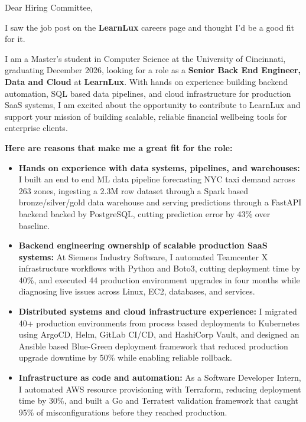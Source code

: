 \documentclass[11pt]{letter}
\date{}
\begin{document}
\begin{letter}{}

\opening{Dear Hiring Committee,}

I saw the job post on the \textbf{LearnLux} careers page and thought I'd be a good fit for it.

I am a Master's student in Computer Science at the University of Cincinnati, graduating December 2026, looking for a role as a \textbf{Senior Back End Engineer, Data and Cloud} at \textbf{LearnLux}. With hands on experience building backend automation, SQL based data pipelines, and cloud infrastructure for production SaaS systems, I am excited about the opportunity to contribute to LearnLux and support your mission of building scalable, reliable financial wellbeing tools for enterprise clients.

\textbf{Here are reasons that make me a great fit for the role:}

\begin{itemize}[leftmargin=*, itemsep=0.45em]
    \item \textbf{Hands on experience with data systems, pipelines, and warehouses:} I built an end to end ML data pipeline forecasting NYC taxi demand across 263 zones, ingesting a 2.3M row dataset through a Spark based bronze/silver/gold data warehouse and serving predictions through a FastAPI backend backed by PostgreSQL, cutting prediction error by 43\% over baseline.

    \item \textbf{Backend engineering ownership of scalable production SaaS systems:} At Siemens Industry Software, I automated Teamcenter X infrastructure workflows with Python and Boto3, cutting deployment time by 40\%, and executed 44 production environment upgrades in four months while diagnosing live issues across Linux, EC2, databases, and services.

    \item \textbf{Distributed systems and cloud infrastructure experience:} I migrated 40+ production environments from process based deployments to Kubernetes using ArgoCD, Helm, GitLab CI/CD, and HashiCorp Vault, and designed an Ansible based Blue-Green deployment framework that reduced production upgrade downtime by 50\% while enabling reliable rollback.

    \item \textbf{Infrastructure as code and automation:} As a Software Developer Intern, I automated AWS resource provisioning with Terraform, reducing deployment time by 30\%, and built a Go and Terratest validation framework that caught 95\% of misconfigurations before they reached production.


\end{itemize}
\end{letter}
\end{document}
